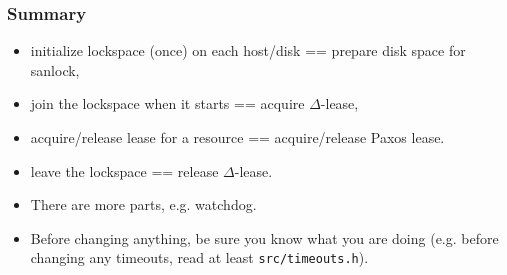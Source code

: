 \documentclass[10pt,utf8]{beamer}
\begin{document}

\begin{frame}
  \frametitle{Summary}

  \begin{itemize}
    \item initialize lockspace (once) on each host/disk == prepare disk space for sanlock,
    \item join the lockspace when it starts == acquire $\Delta$-lease,
    \item acquire/release lease for a resource == acquire/release Paxos lease.
    \item leave the lockspace == release $\Delta$-lease.
   \end{itemize}
   
   \vspace{0.5cm}
   
   \begin{itemize}
    \item There are more parts, e.g. watchdog.
    \item Before changing anything, be sure you know what you are doing (e.g. before changing any timeouts, read at least \texttt{src/timeouts.h}).
   \end{itemize}
\end{frame}


\end{document}
